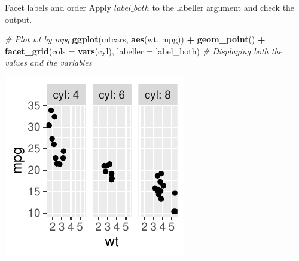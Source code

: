 \documentclass[
  ignorenonframetext,
]{beamer}
\newenvironment{Shaded}{\begin{snugshade}}{\end{snugshade}}
\newcommand{\AttributeTok}[1]{\textcolor[rgb]{0.13,0.29,0.53}{#1}}
\newcommand{\CommentTok}[1]{\textcolor[rgb]{0.56,0.35,0.01}{\textit{#1}}}
\newcommand{\FunctionTok}[1]{\textcolor[rgb]{0.13,0.29,0.53}{\textbf{#1}}}
\newcommand{\NormalTok}[1]{#1}
\newcommand{\SpecialCharTok}[1]{\textcolor[rgb]{0.81,0.36,0.00}{\textbf{#1}}}
\begin{document}
\begin{frame}[fragile]{Facet labels and order}
\label{facet-labels-and-order-4}
Apply \(label\_both\) to the labeller argument and check the output.


\begin{Shaded}
\begin{Highlighting}[]
\CommentTok{\# Plot wt by mpg}
\FunctionTok{ggplot}\NormalTok{(mtcars, }\FunctionTok{aes}\NormalTok{(wt, mpg)) }\SpecialCharTok{+} \FunctionTok{geom\_point}\NormalTok{() }\SpecialCharTok{+} \FunctionTok{facet\_grid}\NormalTok{(}\AttributeTok{cols =} \FunctionTok{vars}\NormalTok{(cyl),}
    \AttributeTok{labeller =}\NormalTok{ label\_both)  }\CommentTok{\# Displaying both the values and the variables}
\end{Highlighting}
\end{Shaded}

\begin{center}\includegraphics[width=0.5\linewidth]{Figs/unnamed-chunk-83-1} \end{center}
\end{frame}
\end{document}
